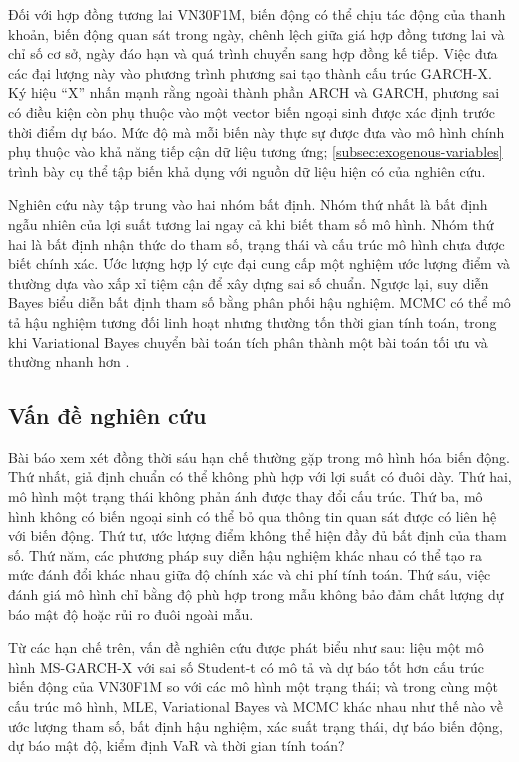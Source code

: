 \documentclass[12pt,a4paper]{article}
\numberwithin{equation}{section}
\begin{document}
Đối với hợp đồng tương lai VN30F1M, biến động có thể chịu tác động của thanh khoản, biến động quan sát trong ngày, chênh lệch giữa giá hợp đồng tương lai và chỉ số cơ sở, ngày đáo hạn và quá trình chuyển sang hợp đồng kế tiếp. Việc đưa các đại lượng này vào phương trình phương sai tạo thành cấu trúc GARCH-X. Ký hiệu ``X'' nhấn mạnh rằng ngoài thành phần ARCH và GARCH, phương sai có điều kiện còn phụ thuộc vào một vector biến ngoại sinh được xác định trước thời điểm dự báo. Mức độ mà mỗi biến này thực sự được đưa vào mô hình chính phụ thuộc vào khả năng tiếp cận dữ liệu tương ứng; \cref{subsec:exogenous-variables} trình bày cụ thể tập biến khả dụng với nguồn dữ liệu hiện có của nghiên cứu.

Nghiên cứu này tập trung vào hai nhóm bất định. Nhóm thứ nhất là bất định ngẫu nhiên của lợi suất tương lai ngay cả khi biết tham số mô hình. Nhóm thứ hai là bất định nhận thức do tham số, trạng thái và cấu trúc mô hình chưa được biết chính xác. Ước lượng hợp lý cực đại cung cấp một nghiệm ước lượng điểm và thường dựa vào xấp xỉ tiệm cận để xây dựng sai số chuẩn. Ngược lại, suy diễn Bayes biểu diễn bất định tham số bằng phân phối hậu nghiệm. MCMC có thể mô tả hậu nghiệm tương đối linh hoạt nhưng thường tốn thời gian tính toán, trong khi Variational Bayes chuyển bài toán tích phân thành một bài toán tối ưu và thường nhanh hơn \cite{jordan1999,blei2017}.

\subsection{Vấn đề nghiên cứu}\label{subsec:van-de}

Bài báo xem xét đồng thời sáu hạn chế thường gặp trong mô hình hóa biến động. Thứ nhất, giả định chuẩn có thể không phù hợp với lợi suất có đuôi dày. Thứ hai, mô hình một trạng thái không phản ánh được thay đổi cấu trúc. Thứ ba, mô hình không có biến ngoại sinh có thể bỏ qua thông tin quan sát được có liên hệ với biến động. Thứ tư, ước lượng điểm không thể hiện đầy đủ bất định của tham số. Thứ năm, các phương pháp suy diễn hậu nghiệm khác nhau có thể tạo ra mức đánh đổi khác nhau giữa độ chính xác và chi phí tính toán. Thứ sáu, việc đánh giá mô hình chỉ bằng độ phù hợp trong mẫu không bảo đảm chất lượng dự báo mật độ hoặc rủi ro đuôi ngoài mẫu.

Từ các hạn chế trên, vấn đề nghiên cứu được phát biểu như sau: liệu một mô hình MS-GARCH-X với sai số Student-t có mô tả và dự báo tốt hơn cấu trúc biến động của VN30F1M so với các mô hình một trạng thái; và trong cùng một cấu trúc mô hình, MLE, Variational Bayes và MCMC khác nhau như thế nào về ước lượng tham số, bất định hậu nghiệm, xác suất trạng thái, dự báo biến động, dự báo mật độ, kiểm định VaR và thời gian tính toán?
\end{document}
